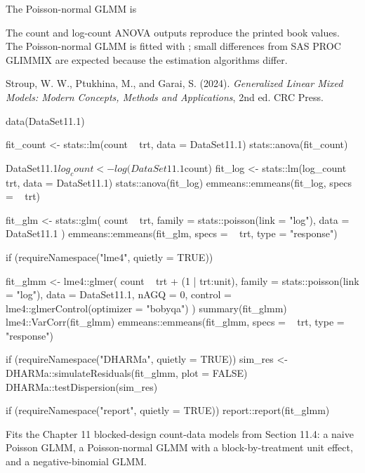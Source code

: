 \documentclass[a4paper]{book}
\begin{document}
%
\begin{Details}
The Poisson-normal GLMM is
\end{Details}
%
\begin{Note}
The count and log-count ANOVA outputs reproduce the printed book values.
The Poisson-normal GLMM is fitted with ; small differences from
SAS PROC GLIMMIX are expected because the estimation algorithms differ.
\end{Note}
%
\begin{References}
Stroup, W. W., Ptukhina, M., and Garai, S. (2024).
\emph{Generalized Linear Mixed Models: Modern Concepts, Methods and
Applications}, 2nd ed. CRC Press.
\end{References}
%
\begin{SeeAlso}
\end{SeeAlso}
%
\begin{Examples}
\begin{ExampleCode}
data(DataSet11.1)

fit_count <- stats::lm(count ~ trt, data = DataSet11.1)
stats::anova(fit_count)

DataSet11.1$log_count <- log(DataSet11.1$count)
fit_log <- stats::lm(log_count ~ trt, data = DataSet11.1)
stats::anova(fit_log)
emmeans::emmeans(fit_log, specs = ~ trt)

fit_glm <- stats::glm(
  count ~ trt,
  family = stats::poisson(link = "log"),
  data = DataSet11.1
)
emmeans::emmeans(fit_glm, specs = ~ trt, type = "response")

if (requireNamespace("lme4", quietly = TRUE)) {
  fit_glmm <- lme4::glmer(
    count ~ trt + (1 | trt:unit),
    family = stats::poisson(link = "log"),
    data = DataSet11.1,
    nAGQ = 0,
    control = lme4::glmerControl(optimizer = "bobyqa")
  )
  summary(fit_glmm)
  lme4::VarCorr(fit_glmm)
  emmeans::emmeans(fit_glmm, specs = ~ trt, type = "response")

  if (requireNamespace("DHARMa", quietly = TRUE)) {
    sim_res <- DHARMa::simulateResiduals(fit_glmm, plot = FALSE)
    DHARMa::testDispersion(sim_res)
  }

  if (requireNamespace("report", quietly = TRUE)) {
    report::report(fit_glmm)
  }
}
\end{ExampleCode}
\end{Examples}
%
\begin{Description}
Fits the Chapter 11 blocked-design count-data models from Section 11.4:
a naive Poisson GLMM, a Poisson-normal GLMM with a block-by-treatment unit
effect, and a negative-binomial GLMM.
\end{Description}
\end{document}
